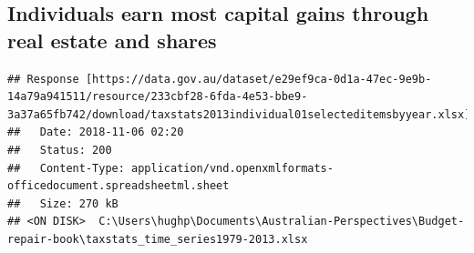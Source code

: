 \documentclass[tikz]{standalone}\usepackage[]{graphicx}\usepackage[]{color}
\makeatletter
\newenvironment{kframe}{%
 \def\at@end@of@kframe{}%
 \ifinner\ifhmode%
  \def\at@end@of@kframe{\end{minipage}}%
  \begin{minipage}{\columnwidth}%
 \fi\fi%
 \def\FrameCommand##1{\hskip\@totalleftmargin \hskip-\fboxsep
 \colorbox{shadecolor}{##1}\hskip-\fboxsep
     \hskip-\linewidth \hskip-\@totalleftmargin \hskip\columnwidth}%
 \MakeFramed {\advance\hsize-\width
   \@totalleftmargin\z@ \linewidth\hsize
   \@setminipage}}%
 {\par\unskip\endMakeFramed%
 \at@end@of@kframe}
\newenvironment{knitrout}{}{} %
\makeatother
\begin{document}
\subsection{Individuals earn most capital gains through real estate and shares}
\begin{knitrout}
\color{fgcolor}\begin{kframe}


{\ttfamily\noindent\bfseries\color{errorcolor}{\#\# Error: 'grplot' is not an exported object from 'namespace:grattan'}}\end{kframe}
\end{knitrout}

\begin{knitrout}
\color{fgcolor}\begin{kframe}


{\ttfamily\noindent\bfseries\color{errorcolor}{\#\# Error: 'grplot' is not an exported object from 'namespace:grattan'}}\end{kframe}
\end{knitrout}

\begin{knitrout}
\color{fgcolor}\begin{kframe}
\begin{verbatim}
## Response [https://data.gov.au/dataset/e29ef9ca-0d1a-47ec-9e9b-14a79a941511/resource/233cbf28-6fda-4e53-bbe9-3a37a65fb742/download/taxstats2013individual01selecteditemsbyyear.xlsx]
##   Date: 2018-11-06 02:20
##   Status: 200
##   Content-Type: application/vnd.openxmlformats-officedocument.spreadsheetml.sheet
##   Size: 270 kB
## <ON DISK>  C:\Users\hughp\Documents\Australian-Perspectives\Budget-repair-book\taxstats_time_series1979-2013.xlsx
\end{verbatim}


{\ttfamily\noindent\bfseries\color{errorcolor}{\#\# Error in mutate\_impl(.data, dots): Evaluation error: `to\_fy` is missing, with no default..}}\end{kframe}
\end{knitrout}


\begin{knitrout}
\color{fgcolor}\begin{kframe}


{\ttfamily\noindent\bfseries\color{errorcolor}{\#\# Error: 'grplot' is not an exported object from 'namespace:grattan'}}\end{kframe}
\end{knitrout}
\end{document}
